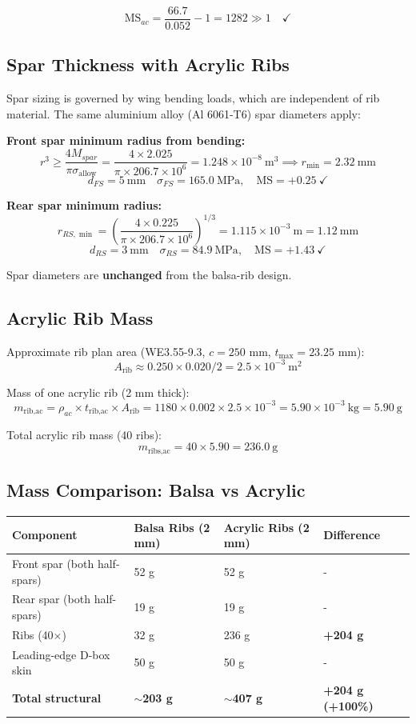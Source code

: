 \documentclass[10pt,a4paper]{article}
\begin{document}
\[
\text{MS}_{ac} = \frac{66.7}{0.052} - 1 = 1282 \gg 1 \quad \checkmark
\]

\subsection{Spar Thickness with Acrylic Ribs}

Spar sizing is governed by wing bending loads, which are independent of rib material. The same aluminium alloy (Al 6061-T6) spar diameters apply:

\textbf{Front spar minimum radius from bending:}
\[
r^3 \geq \frac{4 M_{spar}}{\pi \sigma_{\text{allow}}} = \frac{4 \times 2.025}{\pi \times 206.7 \times 10^6} = 1.248 \times 10^{-8}\ \text{m}^3 \implies r_{\min} = 2.32\ \text{mm}
\]
\[
\boxed{d_{FS} = 5\ \text{mm}} \quad \sigma_{FS} = 165.0\ \text{MPa}, \quad \text{MS} = +0.25\ \checkmark
\]

\textbf{Rear spar minimum radius:}
\[
r_{RS,\min} = \left(\frac{4 \times 0.225}{\pi \times 206.7 \times 10^6}\right)^{1/3} = 1.115 \times 10^{-3}\ \text{m} = 1.12\ \text{mm}
\]
\[
\boxed{d_{RS} = 3\ \text{mm}} \quad \sigma_{RS} = 84.9\ \text{MPa}, \quad \text{MS} = +1.43\ \checkmark
\]

Spar diameters are \textbf{unchanged} from the balsa-rib design.

\subsection{Acrylic Rib Mass}

Approximate rib plan area (WE3.55-9.3, $c = 250$ mm, $t_{\max} = 23.25$ mm):
\[
A_{\text{rib}} \approx 0.250 \times 0.020 / 2 = 2.5 \times 10^{-3}\ \text{m}^2
\]

Mass of one acrylic rib (2 mm thick):
\[
m_{\text{rib,ac}} = \rho_{ac} \times t_{\text{rib,ac}} \times A_{\text{rib}} = 1180 \times 0.002 \times 2.5 \times 10^{-3} = 5.90 \times 10^{-3}\ \text{kg} = 5.90\ \text{g}
\]

Total acrylic rib mass (40 ribs):
\[
m_{\text{ribs,ac}} = 40 \times 5.90 = 236.0\ \text{g}
\]

\subsection{Mass Comparison: Balsa vs Acrylic}

\begin{center}
\begin{tabular}{|l|l|l|l|}
\hline
Component & Balsa Ribs (2 mm) & Acrylic Ribs (2 mm) & Difference \\
\hline
Front spar (both half-spars) & 52 g & 52 g & - \\
\hline
Rear spar (both half-spars) & 19 g & 19 g & - \\
\hline
Ribs (40$\times$) & 32 g & 236 g & \textbf{+204 g} \\
\hline
Leading-edge D-box skin & 50 g & 50 g & - \\
\hline
\textbf{Total structural} & \textbf{$\sim$203 g} & \textbf{$\sim$407 g} & \textbf{+204 g (+100\%)} \\
\hline
\end{tabular}
\end{center}
\end{document}
